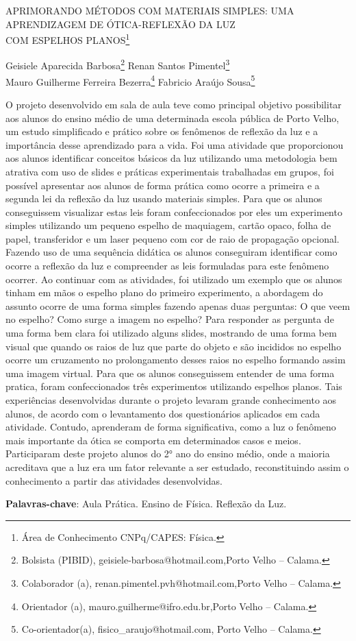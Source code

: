 \documentclass[article,12pt,onesidea,4paper,english,brazil]{abntex2}
\begin{document}
	
	
	\frenchspacing 
	
	\begin{center}
		\LARGE APRIMORANDO MÉTODOS COM MATERIAIS SIMPLES: UMA APRENDIZAGEM DE ÓTICA-REFLEXÃO DA LUZ \\COM ESPELHOS PLANOS\footnote{Área de Conhecimento CNPq/CAPES: Física.}
		
		\normalsize
		Geisiele Aparecida Barbosa\footnote{Bolsista (PIBID), geisiele-barbosa@hotmail.com,Porto Velho – Calama.} 
		Renan Santos Pimentel\footnote{Colaborador (a), renan.pimentel.pvh@hotmail.com,Porto Velho – Calama.} \\
		Mauro Guilherme Ferreira Bezerra\footnote{Orientador (a), mauro.guilherme@ifro.edu.br,Porto Velho – Calama.} 
		Fabricio Araújo Sousa\footnote{Co-orientador(a), fisico\_araujo@hotmail.com, Porto Velho – Calama.} 
	\end{center}
	
	\noindent 
	O projeto desenvolvido em sala de aula teve como principal objetivo possibilitar aos alunos do ensino médio de uma determinada escola pública de Porto Velho, um estudo simplificado e prático sobre os fenômenos de reflexão da luz e a importância desse aprendizado para a vida. Foi uma atividade que proporcionou aos alunos identificar conceitos básicos da luz utilizando uma metodologia bem atrativa com uso de slides e práticas experimentais trabalhadas em grupos, foi possível apresentar aos alunos de forma prática como ocorre a primeira e a segunda lei da reflexão da luz usando materiais simples. Para que os alunos conseguissem visualizar estas leis foram confeccionados por eles um experimento simples utilizando um pequeno espelho de maquiagem, cartão opaco, folha de papel, transferidor e um laser pequeno com cor de raio de propagação opcional. Fazendo uso de uma sequência didática os alunos conseguiram identificar como ocorre a reflexão da luz e compreender as leis formuladas para este fenômeno ocorrer. Ao continuar com as atividades, foi utilizado um exemplo que os alunos tinham em mãos o espelho plano do primeiro experimento, a abordagem do assunto ocorre de uma forma simples fazendo apenas duas perguntas: O que veem no espelho? Como surge a imagem no espelho? Para responder as pergunta de uma forma bem clara foi utilizado alguns slides, mostrando de uma forma bem visual que quando os raios de luz que parte do objeto e são incididos no espelho ocorre um cruzamento no prolongamento desses raios no espelho formando assim uma imagem virtual. Para que os alunos conseguissem entender de uma forma pratica, foram confeccionados três experimentos utilizando espelhos planos. Tais experiências desenvolvidas durante o projeto levaram grande conhecimento aos alunos, de acordo com o levantamento dos questionários aplicados em cada atividade. Contudo, aprenderam de forma significativa, como a luz o fenômeno mais importante da ótica se comporta em determinados casos e meios. Participaram deste projeto alunos do 2° ano do ensino médio, onde a maioria acreditava que a luz era um fator relevante a ser estudado, reconstituindo assim o conhecimento a partir das atividades desenvolvidas.
	
	\vspace{\onelineskip}
	
	\noindent
	\textbf{Palavras-chave}: Aula Prática. Ensino de Física. Reflexão da Luz. 
	
\end{document}
